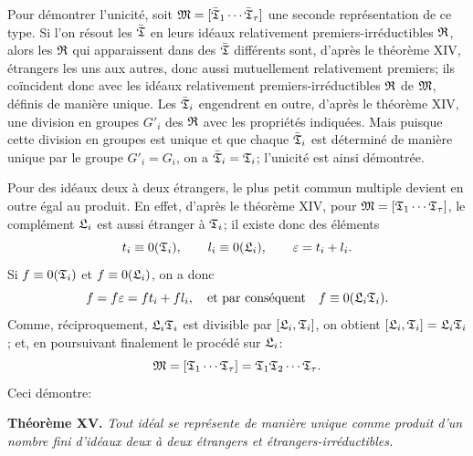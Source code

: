 Pour démontrer l'unicité, soit $\mathfrak{M}=[\bar{\mathfrak{T}}_1\cdots\bar{\mathfrak{T}}_\tau]$ une seconde représentation de ce type. Si l'on résout les $\bar{\mathfrak{T}}$ en leurs idéaux relativement premiers-irréductibles $\mathfrak{R}$, alors les $\mathfrak{R}$ qui apparaissent dans des $\bar{\mathfrak{T}}$ différents sont, d'après le théorème XIV, étrangers les uns aux autres, donc aussi mutuellement relativement premiers; ils coïncident donc avec les idéaux relativement premiers-irréductibles $\mathfrak{R}$ de $\mathfrak{M}$, définis de manière unique. Les $\bar{\mathfrak{T}}_i$ engendrent en outre, d'après le théorème XIV, une division en groupes $G'_i$ des $\mathfrak{R}$ avec les propriétés indiquées. Mais puisque cette division en groupes est unique et que chaque $\bar{\mathfrak{T}}_i$ est déterminé de manière unique par le groupe $G'_i=G_i$, on a $\bar{\mathfrak{T}}_i=\mathfrak{T}_i$; l'unicité est ainsi démontrée.

Pour des idéaux deux à deux étrangers, le plus petit commun multiple devient en outre égal au produit. En effet, d'après le théorème XIV, pour $\mathfrak{M}=[\mathfrak{T}_1\cdots\mathfrak{T}_\tau]$, le complément $\mathfrak{L}_i$ est aussi étranger à $\mathfrak{T}_i$; il existe donc des éléments
\[
 t_i\equiv0(\mathfrak{T}_i),
 \qquad
 l_i\equiv0(\mathfrak{L}_i),
 \qquad
 \varepsilon=t_i+l_i.
\]
Si $f\equiv0(\mathfrak{T}_i)$ et $f\equiv0(\mathfrak{L}_i)$, on a donc
\[
 f=f\varepsilon=ft_i+fl_i,
 \quad\text{et par conséquent}\quad
 f\equiv0(\mathfrak{L}_i\mathfrak{T}_i).
\]
Comme, réciproquement, $\mathfrak{L}_i\mathfrak{T}_i$ est divisible par $[\mathfrak{L}_i,\mathfrak{T}_i]$, on obtient $[\mathfrak{L}_i,\mathfrak{T}_i]=\mathfrak{L}_i\mathfrak{T}_i$; et, en poursuivant finalement le procédé sur $\mathfrak{L}_i$:
\[
 \mathfrak{M}=[\mathfrak{T}_1\cdots\mathfrak{T}_\tau]
       =\mathfrak{T}_1\mathfrak{T}_2\cdots\mathfrak{T}_\tau.
\]
Ceci démontre:

\textbf{Théorème XV.} \emph{Tout idéal se représente de manière unique comme produit d'un nombre fini d'idéaux deux à deux étrangers et étrangers-irréductibles.}
